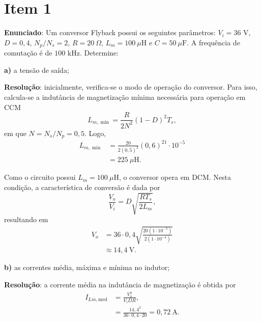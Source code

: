 \section*{Item 1}\label{it:1}

\textbf{Enunciado}: Um conversor Flyback possui os seguintes parâmetros: $V_i = 36$ V, $D = 0,4$, $N_p/N_s = 2$, $R = 20~\Omega$, $L_m = 100~\mu\text{H}$ e $C = 50~\mu\text{F}$. A frequência de comutação é de $100$ kHz. Determine:

\medskip
\textbf{a)} a tensão de saída;

\medskip
\textbf{Resolução}: inicialmente, verifica-se o modo de operação do conversor. Para isso, calcula-se a indutância de magnetização mínima necessária para operação em CCM~\cite{flyback_notas}
\begin{equation*}
	L_{m,\min}=\frac{R}{2N^2}(1-D)^2T_s,
\end{equation*}
em que $N=N_s/N_p=0{,}5$. Logo,
\begin{equation*}
	\begin{aligned}
		L_{m,\min}
		&=\frac{20}{2(0{,}5)^2}(0{,}6)^21\cdot10^{-5}\\
		&=225~\mu\mathrm{H}.
	\end{aligned}
\end{equation*}

Como o circuito possui $L_m=100~\mu$H, o conversor opera em DCM. Nesta condição, a característica de conversão é dada por
\begin{equation*}
	\frac{V_o}{V_i}
	=
	D\sqrt{\frac{RT_s}{2L_m}},
\end{equation*}
resultando em
\begin{equation*}
	\begin{aligned}
		V_o
		&=36\cdot0{,}4
		\sqrt{\frac{20(1\cdot10^{-5})}{2(1\cdot10^{-4})}}\\
		&\approx14{,}4~\mathrm{V}.
	\end{aligned}
\end{equation*}

\medskip
\textbf{b)} as correntes média, máxima e mínima no indutor;

\medskip
\textbf{Resolução}: a corrente média na indutância de magnetização é obtida por~\cite{flyback_notas}
\begin{equation*}
	\begin{aligned}
		I_{Lm,\mathrm{med}}
		&=
		\frac{V_o^2}{V_iDR},\\
		&=
		\frac{14{,}4^2}{36\cdot0{,}4\cdot20}
		=0{,}72~\mathrm{A}.
	\end{aligned}
\end{equation*}

